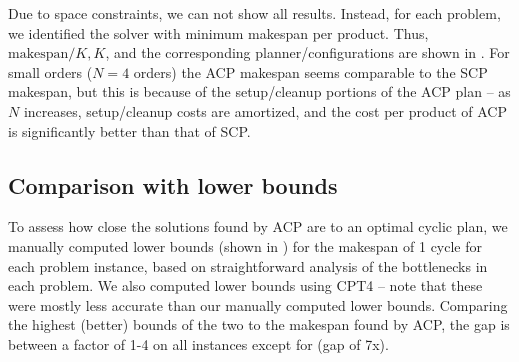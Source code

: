 Due to space constraints, we can not show all results. Instead, for each problem, we identified the solver with minimum makespan per product. Thus, $\mbox{makespan}/K, K$, and the corresponding planner/configurations are shown in .
For small orders ($N=4$ orders) the ACP makespan  seems comparable to the SCP makespan, but this is because of the setup/cleanup portions of the ACP plan --  as $N$ increases, setup/cleanup costs are amortized, and the cost per product of ACP is significantly better than that of SCP.

% 




\subsection{Comparison with lower bounds}
\label{lbound}

To assess how close the solutions found by ACP are to an optimal
cyclic plan, we manually computed lower bounds (shown in ) for the makespan of 1
cycle for each problem instance, based on straightforward analysis of the bottlenecks in each problem. We also computed lower
  bounds using CPT4 -- note that these were mostly less accurate than our manually computed lower bounds.  Comparing the highest (better) bounds of the two 
to the makespan found by ACP, the gap is between a factor of 1-4 on all instances except for \barm (gap of 7x).

% 


